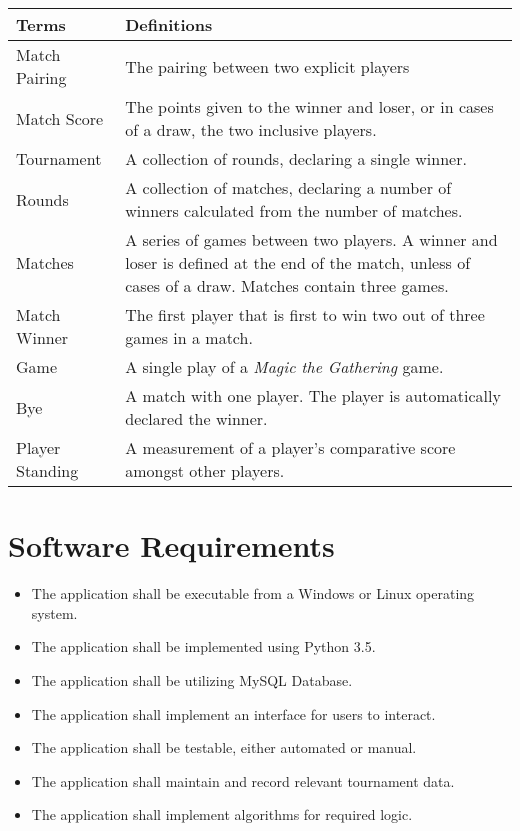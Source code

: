 \documentclass[11pt]{article}
\begin{document}
\begin{center}
\begin{tabular}{|m{4cm}|m{11cm}|}
    \hline
    \textbf{Terms} & \textbf{Definitions} \\
    \hline
    Match Pairing & The pairing between two explicit players\\
    \hline
    Match Score & The points given to the winner and loser, or in cases of a draw, the two inclusive players.\\
    \hline
    Tournament & A collection of rounds, declaring a single winner.\\
    \hline
    Rounds & A collection of matches, declaring a number of winners calculated from the number of matches.\\
    \hline
    Matches & A series of games between two players. A winner and loser is defined at the end of the match, unless of cases of a draw. Matches contain three games.\\
    \hline
    Match Winner & The first player that is first to win two out of three games in a match.\\
    \hline
    Game & A single play of a \textit{Magic the Gathering} game.\\
    \hline
    Bye & A match with one player. The player is automatically declared the winner.\\
    \hline
    Player Standing & A measurement of a player's comparative score amongst other players.\\
    \hline
\end{tabular}
\label{table:1}
\end{center}

\section{Software Requirements}
\begin{itemize}
\item The application shall be executable from a Windows or Linux operating system.
\item The application shall be implemented using Python 3.5.
\item The application shall be utilizing MySQL Database.
\item The application shall implement an interface for users to interact.
\item The application shall be testable, either automated or manual.
\item The application shall maintain and record relevant tournament data.
\item The application shall implement algorithms for required logic.
\end{itemize}
\end{document}
